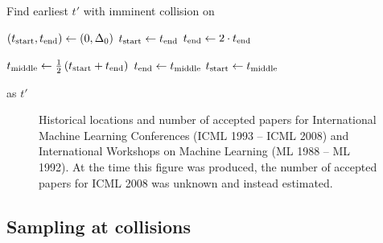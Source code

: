 \begin{algorithm}[tb]
   \caption{Find earliest $t'$ with imminent collision on \CS{}}
   \label{alg:temporalsearch}
\begin{algorithmic}
        \State $(t_{\text{start}}{}, t_{\text{end}}{}) \gets (0, \Delta_0)$
    \Repeat {}
        \State $t_{\text{start}}{} \gets t_{\text{end}}{}$
        \State $t_{\text{end}}{} \gets 2 \cdot t_{\text{end}}{}$
     

    \Repeat
        \State $t_{\text{middle}}{} \gets \frac{1}{2} \left(t_{\text{start}}{} + t_{\text{end}}{} \right)$
            \State $t_{\text{end}}{} \gets t_{\text{middle}}{}$
        \Else
        \State $t_{\text{start}}{} \gets t_{\text{middle}}{}$
        \EndIf

    \State \Return \ts{} as $t'$
    \EndProcedure
\end{algorithmic}
\end{algorithm}


\begin{figure}[ht]
    \vskip 0.2in
    \begin{center}
    \centerline{}
    \caption{Historical locations and number of accepted papers for International
    Machine Learning Conferences (ICML 1993 -- ICML 2008) and International
    Workshops on Machine Learning (ML 1988 -- ML 1992). At the time this figure was
    produced, the number of accepted papers for ICML 2008 was unknown and instead
    estimated.}
    \label{icml-historical}
    \end{center}
    \vskip -0.2in
\end{figure}

\subsection{Sampling at collisions} \label{ss:sampling}

